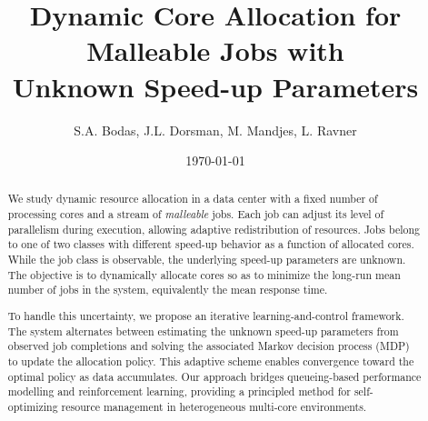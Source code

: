 \documentclass[11pt]{article}
\title{Dynamic Core Allocation for Malleable Jobs with \\ Unknown Speed-up Parameters}
\author{S.A. Bodas, J.L. Dorsman, M. Mandjes, L. Ravner}
\date{\today}
\theoremstyle{remark}
\theoremstyle{definition}
\numberwithin{equation}{section}
\begin{document}
\maketitle

\begin{abstract}
    

\noindent 
We study dynamic resource allocation in a data center with a fixed number of processing cores and a stream of \textit{malleable} jobs. Each job can adjust its level of parallelism during execution, allowing adaptive redistribution of resources. Jobs belong to one of two classes with different speed-up behavior as a function of allocated cores. While the job class is observable, the underlying speed-up parameters are unknown. The objective is to dynamically allocate cores so as to minimize the long-run mean number of jobs in the system, equivalently the mean response time.

\noindent To handle this uncertainty, we propose an iterative learning-and-control framework. The system alternates between estimating the unknown speed-up parameters from observed job completions and solving the associated Markov decision process (MDP) to update the allocation policy. This adaptive scheme enables convergence toward the optimal policy as data accumulates. Our approach bridges queueing-based performance modelling and reinforcement learning, providing a principled method for self-optimizing resource management in heterogeneous multi-core environments.


\end{abstract}
\end{document}
